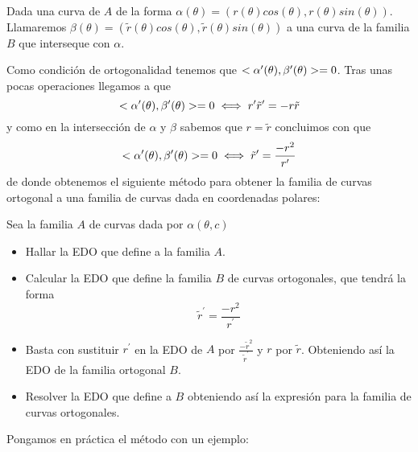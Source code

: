 \documentclass{mathnotes}
\begin{document}
Dada una curva de $A$ de la forma $\alpha(\theta) = (r(\theta)cos(\theta), r(\theta)sin(\theta))$. Llamaremos $\beta(\theta) = (\tilde{r}(\theta)cos(\theta), \tilde{r}(\theta)sin(\theta))$ a una curva de la familia $B$ que interseque con $\alpha$.

Como condición de ortogonalidad tenemos que $<\alpha^\prime(\theta),\beta^\prime(\theta)> = 0$.
Tras unas pocas operaciones llegamos a que $$<\alpha^\prime(\theta),\beta^\prime(\theta)> = 0 \iff r^\prime \tilde{r}^\prime = -r\tilde{r}$$ y como en la intersección de $\alpha$ y $\beta$ sabemos que $r = \tilde{r}$ concluimos con que $$<\alpha^\prime(\theta),\beta^\prime(\theta)> = 0 \iff \tilde{r}^\prime = \frac{-r^2}{r^\prime}$$ de donde obtenemos el siguiente método para obtener la familia de curvas ortogonal a una familia de curvas dada en coordenadas polares:

\begin{method}
Sea la familia $A$ de curvas dada por $\alpha(\theta, c)$
\begin{itemize}
\item Hallar la EDO que define a la familia $A$.
\item Calcular la EDO que define la familia $B$ de curvas ortogonales, que tendrá la forma $$ \tilde{r}^\prime = \frac{-r^2}{r^\prime}$$
\item Basta con sustituir $r^\prime$ en la EDO de $A$ por $\frac{-\tilde{r}^2}{\tilde{r}^\prime}$ y $r$ por $\tilde{r}$. Obteniendo así la EDO de la familia ortogonal $B$.
\item Resolver la EDO que define a $B$ obteniendo así la expresión para la familia de curvas ortogonales.
\end{itemize}
\end{method}

Pongamos en práctica el método con un ejemplo:

\end{document}
